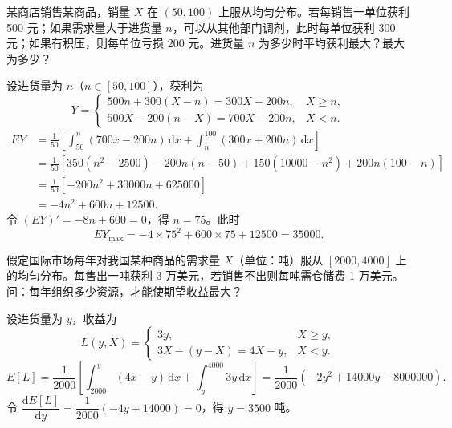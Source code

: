 ﻿\documentclass[lang=cn,11pt]{elegantbook}
\begin{document}
\begin{exercise}\label{exer:4-20-shop}
某商店销售某商品，销量 \(X\) 在 \((50,100)\) 上服从均匀分布。若每销售一单位获利 500 元；如果需求量大于进货量 \(n\)，可以从其他部门调剂，此时每单位获利 300 元；如果有积压，则每单位亏损 200 元。进货量 \(n\) 为多少时平均获利最大？最大为多少？
\end{exercise}
\begin{solution}
设进货量为 \(n\)（\(n \in [50,100]\)），获利为
\[
Y = \begin{cases} 500n + 300(X-n) = 300X + 200n, & X \geqslant n, \\[4pt] 500X - 200(n-X) = 700X - 200n, & X < n. \end{cases}
\]
\[
\begin{aligned}
EY &= \frac{1}{50}\left[\int_{50}^{n}(700x - 200n)\,\mathrm{d}x + \int_{n}^{100}(300x + 200n)\,\mathrm{d}x\right] \\
&= \frac{1}{50}\left[350(n^2-2500) - 200n(n-50) + 150(10000-n^2) + 200n(100-n)\right] \\
&= \frac{1}{50}\left[-200n^2 + 30000n + 625000\right] \\
&= -4n^2 + 600n + 12500.
\end{aligned}
\]
令 \((EY)' = -8n + 600 = 0\)，得 \(n = 75\)。此时
\[
EY_{\max} = -4 \times 75^2 + 600 \times 75 + 12500 = 35000.
\]
\end{solution}

\begin{exercise}\label{exer:4-trade}
假定国际市场每年对我国某种商品的需求量 \(X\)（单位：吨）服从 \([2000, 4000]\) 上的均匀分布。每售出一吨获利 3 万美元，若销售不出则每吨需仓储费 1 万美元。问：每年组织多少资源，才能使期望收益最大？
\end{exercise}
\begin{solution}
设进货量为 \(y\)，收益为
\[
L(y,X) = \begin{cases} 3y, & X \geqslant y, \\[4pt] 3X - (y - X) = 4X - y, & X < y. \end{cases}
\]
\[
E[L] = \frac{1}{2000}\left[\int_{2000}^{y}(4x - y)\,\mathrm{d}x + \int_{y}^{4000}3y\,\mathrm{d}x\right]
= \frac{1}{2000}(-2y^2 + 14000y - 8000000).
\]
令 \(\dfrac{\mathrm{d}E[L]}{\mathrm{d}y} = \dfrac{1}{2000}(-4y + 14000) = 0\)，得 \(y = 3500\) 吨。
\end{solution}
\end{document}
